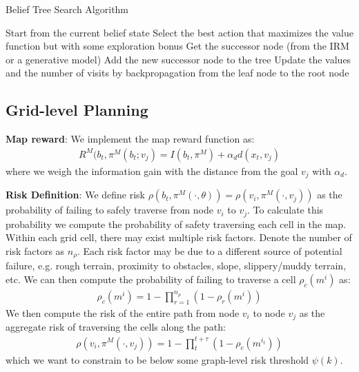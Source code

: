 \documentclass[letterpaper, 10 pt, conference]{ieeeconf}  %
\newcommand{\ph}[1]{{\textbf{#1}:}} %
\begin{document}
\begin{algorithm}[t!]
\caption{Belief Tree Search Algorithm}
\label{alg:pomcp}
\begin{algorithmic} 
  \STATE Start from the current belief state
      \STATE Select the best action that maximizes the value function but with some exploration bonus
      \STATE Get the successor node (from the IRM or a generative model)
      \STATE Add the new successor node to the tree
    \ENDWHILE
    \STATE Update the values and the number of visits by backpropagation from the leaf node to the root node
  \ENDWHILE
\end{algorithmic}
\end{algorithm}



\subsection{Grid-level Planning}

\ph{Map reward}
We implement the map reward function as:
\begin{align}
    R^M(b_t, \pi^M(b_t;v_j) = I(b_t,\pi^M) + \alpha_d d(x_t,v_j)
\end{align}
where we weigh the information gain with the distance from the goal $v_j$ with $\alpha_d$.

\ph{Risk Definition}
We define risk  $\rho(b_t,\pi^M(\cdot,\theta)) = \rho(v_i,\pi^M(\cdot,v_j))$ as the probability of failing to safely traverse from node $v_i$ to $v_j$.  To calculate this probability we compute the probability of safety traversing each cell in the map.  Within each grid cell, there may exist multiple risk factors.  Denote the number of risk factors as $n_\rho$.  Each risk factor may be due to a different source of potential failure, e.g. rough terrain, proximity to obstacles, slope, slippery/muddy terrain, etc.  We can then compute the probability of failing to traverse a cell $\rho_c(m^i)$ as:
\begin{align}
    \rho_c(m^i) = 1-\prod_{r=1}^{n_\rho} (1-\rho_r(m^i))
\end{align}
We then compute the risk of the entire path from node $v_i$ to node $v_j$ as the aggregate risk of traversing the cells along the path:
\begin{align}
    \rho(v_i,\pi^M(\cdot,v_j))=1-\prod_t^{t+\tau}(1-\rho_c(m^{i_t}))
\end{align}
which we want to constrain to be below some graph-level risk threshold $\psi(k)$.
\end{document}
